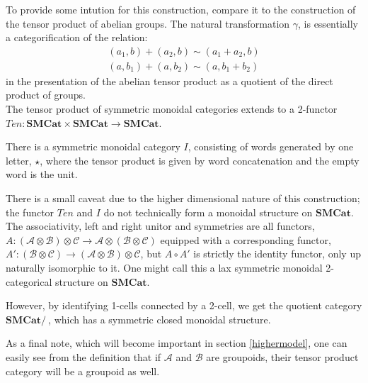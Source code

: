 To provide some intution for this construction, compare it to the construction of the tensor product of abelian groups. The natural transformation $\gamma$, is essentially a categorification of the relation:
\[
  \begin{split}
    (a_1,b)+(a_2,b) \sim (a_1+a_2,b) \\
    (a,b_1)+(a,b_2) \sim (a,b_1+b_2)
  \end{split}
\]
in the presentation of the abelian tensor product as a quotient of the direct product of groups.\\
The tensor product of symmetric monoidal categories extends to a 2-functor $Ten : \mathbf{SMCat} \times \mathbf{SMCat} \to \mathbf{SMCat}$.
\begin{defn}
  There is a symmetric monoidal category $I$, consisting of words generated by one letter, $\star$, where the tensor product is given by word concatenation and the empty word is the unit.
\end{defn}
There is a small caveat due to the higher dimensional nature of this construction; the functor $Ten$ and $I$ do not technically form a monoidal structure on $\mathbf{SMCat}$. The associativity, left and right unitor and symmetries are all functors, $A : (\mathcal{A} \otimes \mathcal{B}) \otimes \mathcal{C} \to \mathcal{A} \otimes (\mathcal{B} \otimes \mathcal{C})$ equipped with a corresponding functor, $A' : (\mathcal{B} \otimes \mathcal{C}) \to (\mathcal{A} \otimes \mathcal{B}) \otimes \mathcal{C}$, but $A \circ A'$ is strictly the identity functor, only up naturally isomorphic to it. One might call this a lax symmetric monoidal 2-categorical structure on $\mathbf{SMCat}$.

However, by identifying 1-cells connected by a 2-cell, we get the quotient category $\mathbf{SMCat}/~$, which has a symmetric closed monoidal structure.

As a final note, which will become important in section \ref{highermodel}, one can easily see from the definition that if $\mathcal{A}$ and $\mathcal{B}$ are groupoids, their tensor product category will be a groupoid as well.
%
